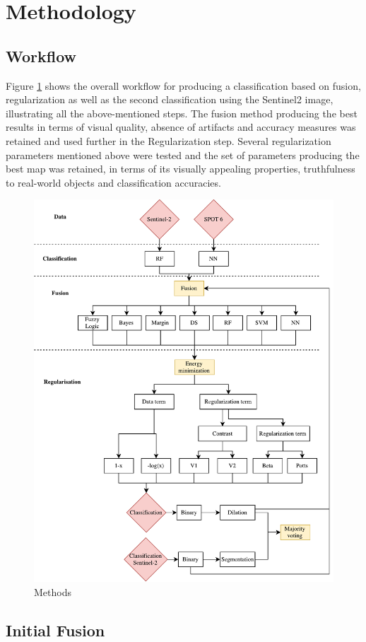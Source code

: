 \documentclass[10pt]{article}
\begin{document}
\section{Methodology}\label{sec:method}
\subsection{Workflow}
Figure \ref{fig:methods} shows the overall workflow for producing a classification based on fusion, regularization as well as the second classification using the Sentinel2 image, illustrating all the above-mentioned steps. The fusion method producing the best results in terms of visual quality, absence of artifacts and accuracy measures was retained and used further in the Regularization step. Several regularization parameters mentioned above were tested and the set of parameters producing the best map was retained, in terms of its visually appealing properties, truthfulness to real-world objects and classification accuracies.

\begin{figure}[H]
    \centering
    \includegraphics[width=.7\textwidth]{IGN-methods}
    \caption{Methods}
    \label{fig:methods}
\end{figure}
\subsection{Initial Fusion}
\end{document}

